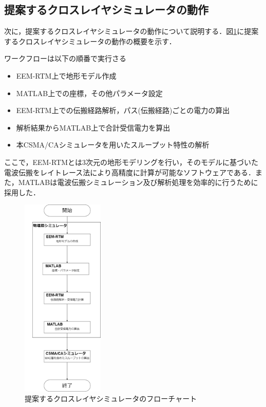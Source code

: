 \documentclass[a4paper,10pt]{ltjsarticle}
\begin{document}
\clearpage
\subsection{提案するクロスレイヤシミュレータの動作}

次に，提案するクロスレイヤシミュレータの動作について説明する．図\ref{fig:cross_simu_flow}に提案するクロスレイヤシミュレータの動作の概要を示す．

ワークフローは以下の順番で実行さる

\begin{itemize}
  \item EEM-RTM上で地形モデル作成
  \item MATLAB上での座標，その他パラメータ設定
  \item EEM-RTM上での伝搬経路解析，パス(伝搬経路)ごとの電力の算出
  \item 解析結果からMATLAB上で合計受信電力を算出
  \item 本CSMA/CAシミュレータを用いたスループット特性の解析
\end{itemize}

ここで，EEM-RTMとは3次元の地形モデリングを行い，そのモデルに基づいた電波伝搬をレイトレース法により高精度に計算が可能なソフトウェアである．また，MATLABは電波伝搬シミュレーション及び解析処理を効率的に行うために採用した．



\begin{figure}[H]
  \centering
  \includegraphics[width=0.35\textwidth]{./assets/cross_simu_flow.drawio.png}
  \caption{提案するクロスレイヤシミュレータのフローチャート}
  \label{fig:cross_simu_flow}
\end{figure}
\end{document}
